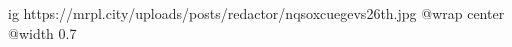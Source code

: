  
 
 
 
 

\ifcmt
  ig https://mrpl.city/uploads/posts/redactor/nqsoxcuegevs26th.jpg
  @wrap center
  @width 0.7
\fi
